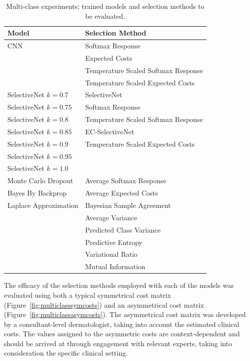 \begin{table}[h]
	\centering
	\caption{Multi-class experiments; trained models and selection methods to be evaluated.}
	\label{tab:multi-class-experiment-setup}
	\begin{tabular}{|l|l|}
		\hline
		Model & Selection Method \\ \hline
		CNN & Softmax Response \\
		& Expected Costs \\
		& Temperature Scaled Softmax Response \\
		& Temperature Scaled Expected Costs \\ \hline
		SelectiveNet $k=0.7$ & SelectiveNet \\
		SelectiveNet $k=0.75$ & Softmax Response \\
		SelectiveNet $k=0.8$ & Temperature Scaled Softmax Response \\
		SelectiveNet $k=0.85$ & EC-SelectiveNet \\
		SelectiveNet $k=0.9$ & Temperature Scaled Expected Costs \\
		SelectiveNet $k=0.95$ &  \\
		SelectiveNet $k=1.0$ &  \\ \hline
		Monte Carlo Dropout & Average Softmax Response \\
		Bayes By Backprop & Average Expected Costs \\
		Laplace Approximation & Bayesian Sample Agreement \\
		& Average Variance \\
		& Predicted Class Variance \\
		& Predictive Entropy \\
		& Variational Ratio \\
		& Mutual Information \\ \hline
	\end{tabular}
\end{table}

The efficacy of the selection methods employed with each of the models was evaluated using both a typical symmetrical cost matrix (Figure~\ref{fig:multiclasssymcosts}) and an asymmetrical cost matrix (Figure~\ref{fig:multiclassasymcosts}). The asymmetrical cost matrix was developed by a consultant-level dermatologist, taking into account the estimated clinical costs. The values assigned to the asymmetric costs are context-dependent and should be arrived at through engagement with relevant experts, taking into consideration the specific clinical setting.

